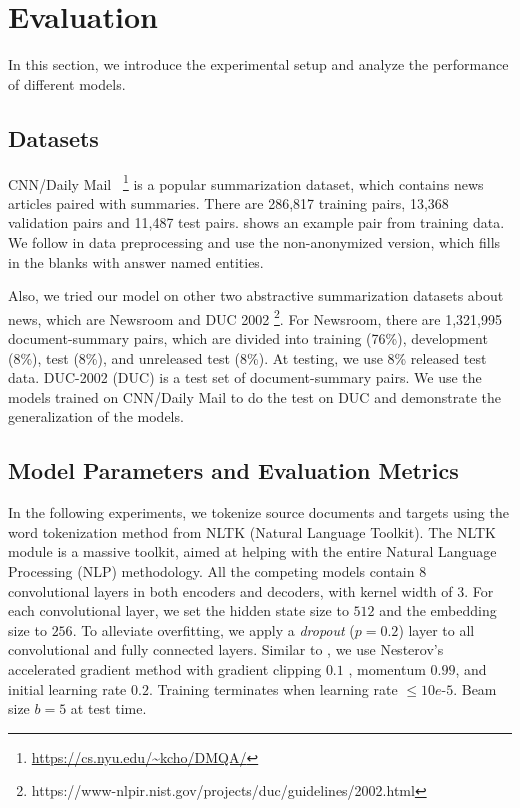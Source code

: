 \section{Evaluation}
\label{sec:eval}
In this section, we introduce the experimental setup
and analyze the performance of different models.

\subsection{Datasets}
CNN/Daily Mail~\citep{HermannKGEKSB15}
\footnote{\url{https://cs.nyu.edu/~kcho/DMQA/}} 
is a popular summarization dataset, 
which contains news articles paired with summaries.
There are 286,817 training pairs,
13,368 validation pairs and 11,487 test pairs.
 shows an example pair from training data.
We follow \cite{SeeLM17} in data preprocessing and use 
the non-anonymized version, which fills in the blanks with answer named entities.

Also, we tried our model on other two abstractive summarization datasets about news, which are Newsroom \citep{Newsroom18} and DUC 2002 \footnote{https://www-nlpir.nist.gov/projects/duc/guidelines/2002.html}. For Newsroom, there are 1,321,995 document-summary pairs, which are divided into training (76\%), development (8\%), test (8\%), and unreleased test (8\%). At testing, we use 8\% released test data. DUC-2002 (DUC) is a test set of document-summary pairs. We use the models trained on CNN/Daily Mail to do the test on DUC and demonstrate the generalization of the models.


\subsection{Model Parameters and Evaluation Metrics}
\label{sec:expset}
In the following experiments, 
we tokenize source documents and targets 
using the word tokenization method from NLTK (Natural Language Toolkit). 
The NLTK module is a massive toolkit, 
aimed at helping with the entire Natural Language Processing (NLP) methodology.
All the competing models contain $8$ convolutional layers in
both encoders and decoders, with kernel width of $3$.
For each convolutional layer, 
we set the hidden state size to $512$ and the embedding size to $256$.
To alleviate overfitting,
we apply a \textit{dropout} ($p=0.2$) layer to 
all convolutional and fully connected layers.
Similar to \citep{gehring2017convs2s}, we use Nesterov's
accelerated gradient method \citep{SutskeverMDH13} with gradient clipping $0.1$ \citep{PascanuMB13}, momentum $0.99$,
and initial learning rate $0.2$.
Training terminates when learning rate $\le 10e$-$5$.
Beam size $b=5$ at test time.

